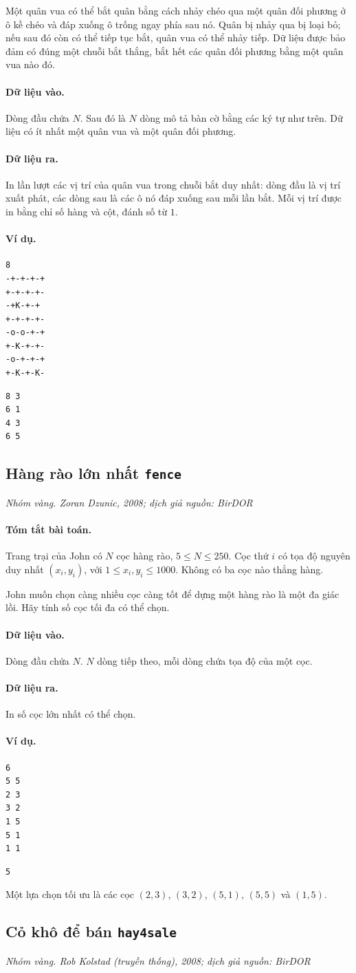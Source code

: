 \documentclass[11pt]{article}
\newcommand{\problem}[4]{%
  \subsection[#1 (#2)]{#1 \hfill {\normalsize\texttt{#2}}}%
  \noindent\textit{#3. #4}\par\smallskip
}
\newcommand{\iosec}[1]{\paragraph{#1}}
\begin{document}
Một quân vua có thể bắt quân bằng cách nhảy chéo qua một quân đối phương ở ô
kề chéo và đáp xuống ô trống ngay phía sau nó. Quân bị nhảy qua bị loại bỏ;
nếu sau đó còn có thể tiếp tục bắt, quân vua có thể nhảy tiếp. Dữ liệu được
bảo đảm có đúng một chuỗi bắt thắng, bắt hết các quân đối phương bằng một
quân vua nào đó.

\iosec{Dữ liệu vào.}
Dòng đầu chứa \(N\). Sau đó là \(N\) dòng mô tả bàn cờ bằng các ký tự như
trên. Dữ liệu có ít nhất một quân vua và một quân đối phương.

\iosec{Dữ liệu ra.}
In lần lượt các vị trí của quân vua trong chuỗi bắt duy nhất: dòng đầu là vị
trí xuất phát, các dòng sau là các ô nó đáp xuống sau mỗi lần bắt. Mỗi vị trí
được in bằng chỉ số hàng và cột, đánh số từ \(1\).

\iosec{Ví dụ.}
\begin{verbatim}
8
-+-+-+-+
+-+-+-+-
-+K-+-+
+-+-+-+-
-o-o-+-+
+-K-+-+-
-o-+-+-+
+-K-+-K-
\end{verbatim}

\begin{verbatim}
8 3
6 1
4 3
6 5
\end{verbatim}

\problem{Hàng rào lớn nhất}{fence}{Nhóm vàng}{Zoran Dzunic, 2008; dịch giả nguồn: BirDOR}

\iosec{Tóm tắt bài toán.}
Trang trại của John có \(N\) cọc hàng rào, \(5\le N\le 250\). Cọc thứ \(i\)
có tọa độ nguyên duy nhất \((x_i,y_i)\), với \(1\le x_i,y_i\le 1000\).
Không có ba cọc nào thẳng hàng.

John muốn chọn càng nhiều cọc càng tốt để dựng một hàng rào là một đa giác
lồi. Hãy tính số cọc tối đa có thể chọn.

\iosec{Dữ liệu vào.}
Dòng đầu chứa \(N\). \(N\) dòng tiếp theo, mỗi dòng chứa tọa độ của một cọc.

\iosec{Dữ liệu ra.}
In số cọc lớn nhất có thể chọn.

\iosec{Ví dụ.}
\begin{verbatim}
6
5 5
2 3
3 2
1 5
5 1
1 1
\end{verbatim}

\begin{verbatim}
5
\end{verbatim}

Một lựa chọn tối ưu là các cọc \((2,3)\), \((3,2)\), \((5,1)\), \((5,5)\)
và \((1,5)\).

\problem{Cỏ khô để bán}{hay4sale}{Nhóm vàng}{Rob Kolstad (truyền thống), 2008; dịch giả nguồn: BirDOR}
\end{document}
